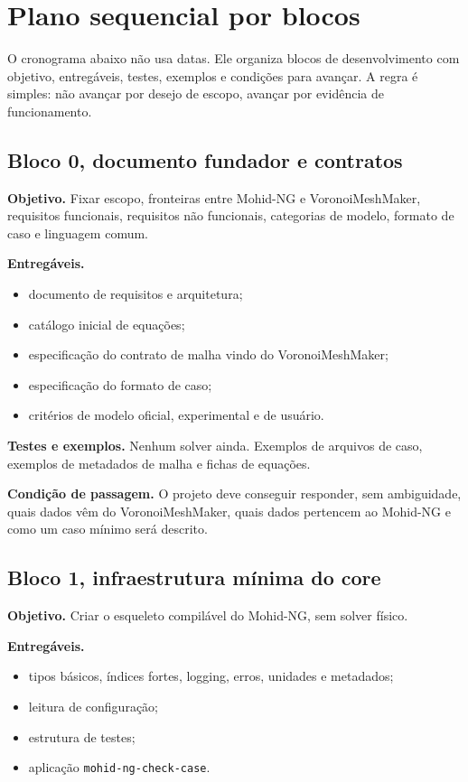 \documentclass[11pt,a4paper]{article}
\begin{document}
\section{Plano sequencial por blocos}

O cronograma abaixo n\~ao usa datas. Ele organiza blocos de desenvolvimento com objetivo, entreg\'aveis, testes, exemplos e condi\c{c}\~oes para avan\c{c}ar. A regra \'e simples: n\~ao avan\c{c}ar por desejo de escopo, avan\c{c}ar por evid\^encia de funcionamento.

\subsection*{Bloco 0, documento fundador e contratos}

\textbf{Objetivo.} Fixar escopo, fronteiras entre Mohid-NG e VoronoiMeshMaker, requisitos funcionais, requisitos n\~ao funcionais, categorias de modelo, formato de caso e linguagem comum.

\textbf{Entreg\'aveis.}
\begin{itemize}
  \item documento de requisitos e arquitetura;
  \item cat\'alogo inicial de equa\c{c}\~oes;
  \item especifica\c{c}\~ao do contrato de malha vindo do VoronoiMeshMaker;
  \item especifica\c{c}\~ao do formato de caso;
  \item crit\'erios de modelo oficial, experimental e de usu\'ario.
\end{itemize}

\textbf{Testes e exemplos.} Nenhum solver ainda. Exemplos de arquivos de caso, exemplos de metadados de malha e fichas de equa\c{c}\~oes.

\textbf{Condi\c{c}\~ao de passagem.} O projeto deve conseguir responder, sem ambiguidade, quais dados v\^em do VoronoiMeshMaker, quais dados pertencem ao Mohid-NG e como um caso m\'inimo ser\'a descrito.

\subsection*{Bloco 1, infraestrutura m\'inima do core}

\textbf{Objetivo.} Criar o esqueleto compil\'avel do Mohid-NG, sem solver f\'isico.

\textbf{Entreg\'aveis.}
\begin{itemize}
  \item tipos b\'asicos, \'{i}ndices fortes, logging, erros, unidades e metadados;
  \item leitura de configura\c{c}\~ao;
  \item estrutura de testes;
  \item aplica\c{c}\~ao \texttt{mohid-ng-check-case}.
\end{itemize}
\end{document}
